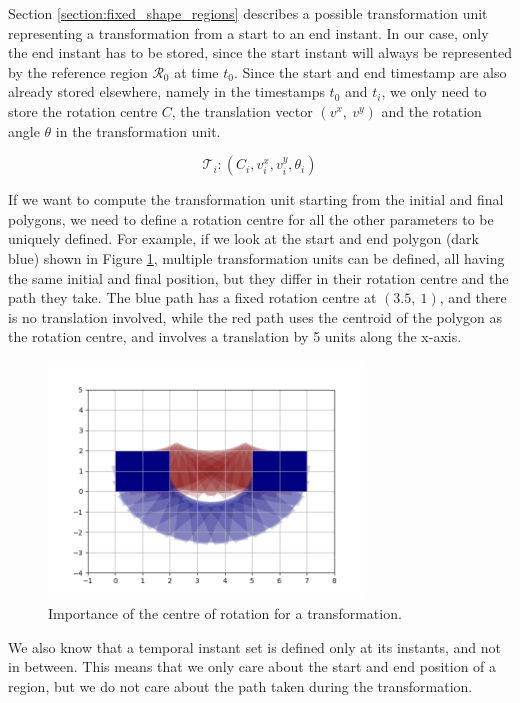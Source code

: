 Section \ref{section:fixed_shape_regions} describes a possible transformation unit representing a transformation from a start to an end instant. In our case, only the end instant has to be stored, since the start instant will always be represented by the reference region $\mathcal{R}_0$ at time $t_{0}$. Since the start and end timestamp are also already stored elsewhere, namely in the timestamps $t_0$ and $t_i$, we only need to store the rotation centre $C$, the translation vector $(v^x,\ v^y)$ and the rotation angle $\theta$ in the transformation unit.

\[
    \mathcal{T}_i: (C_i, v_i^x, v_i^y, \theta_i)
\]

If we want to compute the transformation unit starting from the initial and final polygons, we need to define a rotation centre for all the other parameters to be uniquely defined. For example, if we look at the start and end polygon (dark blue) shown in Figure \ref{fig:center_of_rotation}, multiple transformation units can be defined, all having the same initial and final position, but they differ in their rotation centre and the path they take. The blue path has a fixed rotation centre at $(3.5,\ 1)$, and there is no translation involved, while the red path uses the centroid of the polygon as the rotation centre, and involves a translation by 5 units along the x-axis.

\begin{figure}[h!]
    \centering
    \includegraphics[width=0.75\textwidth]{images/center_of_rotation_importance.png}
    \caption{Importance of the centre of rotation for a transformation.}
    \label{fig:center_of_rotation}
\end{figure}


We also know that a temporal instant set is defined only at its instants, and not in between. This means that we only care about the start and end position of a region, but we do not care about the path taken during the transformation. 

